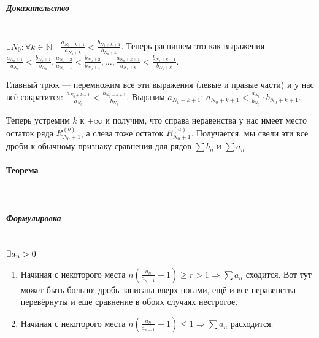 \documentclass{article}
\def\letus{%
\mathord{\setbox0=\hbox{$\exists$}%
         \hbox{\kern 0.125\wd0%
               \vbox to \ht0{%
                  \hrule width 0.75\wd0%
                  \vfill%
                  \hrule width 0.75\wd0}%
               \vrule height \ht0%
               \kern 0.125\wd0}%
       }%
        }
\let\vanillaparagraph\paragraph
\let\vanillasubparagraph\subparagraph
\renewcommand{\paragraph}[1]{\vanillaparagraph{#1}\mbox{}\\}
\renewcommand{\subparagraph}[1]{\vanillasubparagraph{#1}\mbox{}\\}
\begin{document}
\subparagraph{Доказательство}
$\exists N_0 : \forall k \in \mathbb{N} \quad \frac{a_{N_0 + k + 1}}{a_{N_0 + k}} < \frac{b_{N_0 + k + 1}}{b_{N_0 + k}}$. Теперь распишем это как выражения $\frac{a_{N_0 + 1}}{a_{N_0}} < \frac{b_{N_0 + 1}}{b_{N_0}}, \frac{a_{N_0 + 2}}{a_{N_0 + 1}} < \frac{b_{N_0 + 2}}{b_{N_0 + 1}}, \ldots, \frac{a_{N_0 + k + 1}}{a_{N_0 + k}} < \frac{b_{N_0 + k + 1}}{b_{N_0 + k}}$. 
    
Главный трюк --- перемножим все эти выражения (левые и правые части) и у нас всё сократится: $\frac{a_{N_0+k+1}}{a_{N_0}} < \frac{b_{N_0+k+1}}{b_{N_0}}$. Выразим $a_{N_0 + k + 1}$: $a_{N_0 + k + 1} < \frac{a_{N_0}}{b_{N_0}} \cdot b_{N_0+k+1}$.
    
Теперь устремим $k$ к $+\infty$ и получим, что справа неравенства у нас имеет место остаток ряда $R^{(b)}_{N_0+1}$, а слева тоже остаток $R^{(a)}_{N_0+1}$. Получается, мы свели эти все дроби к обычному признаку сравнения для рядов $\sum b_n$ и $\sum a_n$

\paragraph{Теорема}
\subparagraph{Формулировка}
$\letus a_n > 0$
\begin{enumerate}
    \item Начиная с некоторого места $n(\frac{a_n}{a_{n+1}} - 1) \ge r > 1 \Rightarrow \sum a_n$ сходится. Вот тут может быть больно: дробь записана вверх ногами, ещё и все неравенства перевёрнуты и ещё сравнение в обоих случаях нестрогое.
    \item Начиная с некоторого места $n(\frac{a_n}{a_{n+1}} - 1) \le 1 \Rightarrow \sum a_n$ расходится. 
\end{enumerate}
\end{document}
